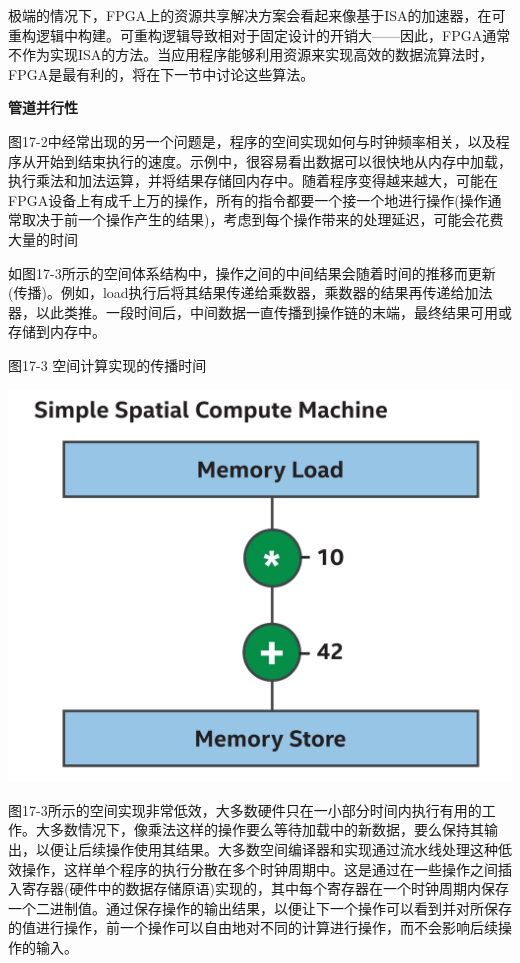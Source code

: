 极端的情况下，FPGA上的资源共享解决方案会看起来像基于ISA的加速器，在可重构逻辑中构建。可重构逻辑导致相对于固定设计的开销大——因此，FPGA通常不作为实现ISA的方法。当应用程序能够利用资源来实现高效的数据流算法时，FPGA是最有利的，将在下一节中讨论这些算法。\par

\hspace*{\fill} \par %
\textbf{管道并行性}

图17-2中经常出现的另一个问题是，程序的空间实现如何与时钟频率相关，以及程序从开始到结束执行的速度。示例中，很容易看出数据可以很快地从内存中加载，执行乘法和加法运算，并将结果存储回内存中。随着程序变得越来越大，可能在FPGA设备上有成千上万的操作，所有的指令都要一个接一个地进行操作(操作通常取决于前一个操作产生的结果)，考虑到每个操作带来的处理延迟，可能会花费大量的时间\par

如图17-3所示的空间体系结构中，操作之间的中间结果会随着时间的推移而更新(传播)。例如，load执行后将其结果传递给乘数器，乘数器的结果再传递给加法器，以此类推。一段时间后，中间数据一直传播到操作链的末端，最终结果可用或存储到内存中。\par

\hspace*{\fill} \par %
图17-3 空间计算实现的传播时间
\begin{center}
	\includegraphics[width=1.0\textwidth]{content/chapter-17/images/3}
\end{center}

图17-3所示的空间实现非常低效，大多数硬件只在一小部分时间内执行有用的工作。大多数情况下，像乘法这样的操作要么等待加载中的新数据，要么保持其输出，以便让后续操作使用其结果。大多数空间编译器和实现通过流水线处理这种低效操作，这样单个程序的执行分散在多个时钟周期中。这是通过在一些操作之间插入寄存器(硬件中的数据存储原语)实现的，其中每个寄存器在一个时钟周期内保存一个二进制值。通过保存操作的输出结果，以便让下一个操作可以看到并对所保存的值进行操作，前一个操作可以自由地对不同的计算进行操作，而不会影响后续操作的输入。\par


